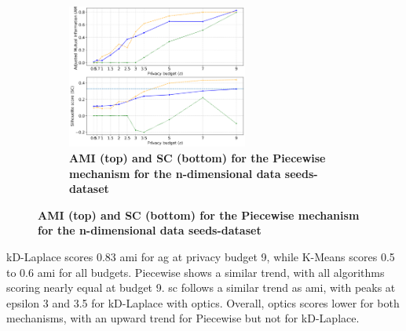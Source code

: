 \begin{figure}[H]
\begin{subfigure}{1\textwidth}
    \caption{\textbf{AMI (top) and SC (bottom) for the Piecewise mechanism for the n-dimensional data seeds-dataset}}
    \centering
    \includegraphics[width=0.65\textwidth]{Results/kd-laplace/piecewise/seeds-dataset/ami-and-sc_7_dimensions.png}
  \end{subfigure}
  \label{fig:validation-seeds-dataset_comparison_nd-laplace}
\end{figure}
kD-Laplace scores 0.83 \gls{ami} for \gls{ag} at privacy budget 9, while K-Means scores 0.5 to 0.6 \gls{ami} for all budgets.
Piecewise shows a similar trend, with all algorithms scoring nearly equal at budget 9. \gls{sc} follows a similar trend as \gls{ami}, with peaks at epsilon 3 and 3.5 for kD-Laplace with \gls{optics}. Overall, \gls{optics} scores lower for both mechanisms, with an upward trend for Piecewise but not for kD-Laplace.
\newpage
